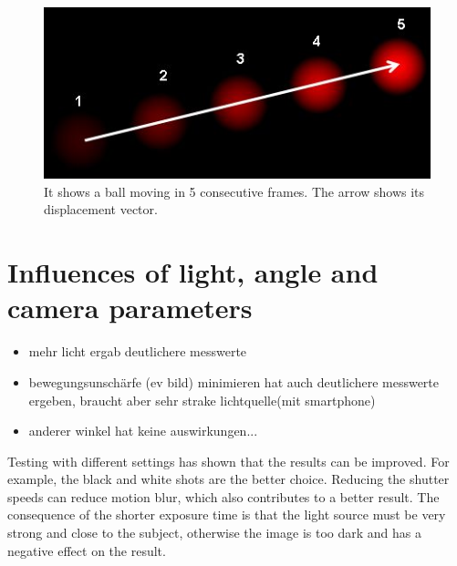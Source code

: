 \documentclass[12pt, a4paper]{report}
\begin{document}
    \noindent
    \begin{figure}[H]
    \centering
    \includegraphics[scale=0.7]{Images/optical_flow_basic1.jpg}
    
    \caption{It shows a ball moving in 5 consecutive frames. The arrow shows its displacement vector.}
    \end{figure}
    
    \section{Influences of light, angle and camera parameters}
    \begin{itemize}
        \item mehr licht ergab deutlichere messwerte
        \item bewegungsunschärfe (ev bild) minimieren hat auch deutlichere messwerte ergeben, braucht aber sehr strake lichtquelle(mit smartphone)
        \item anderer winkel hat keine auswirkungen...
    \end{itemize}
    Testing with different settings has shown that the results can be improved. For example, the black and white shots are the better choice. Reducing the shutter speeds can reduce motion blur, which also contributes to a better result.
    The consequence of the shorter exposure time is that the light source must be very strong and close to the subject, otherwise the image is too dark and has a negative effect on the result.
        

    \newpage
\end{document}
